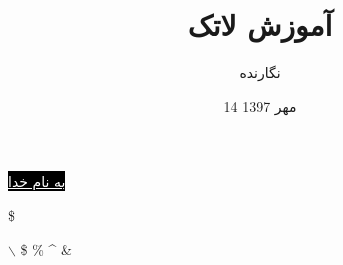 \documentclass[12pt]{article}
\title{آموزش لاتک}
\author{نگارنده}
\date{14 مهر 1397}
\begin{document}
	\maketitle
	\vspace*{2cm}
	\begin{center}
		\colorbox{black}{\textcolor{white}{\underline{\Nas به نام خدا}}}
		\begin{latin}
			\$
			\textcolor{blue}{}
			
						$\backslash$
			\$
			\%
			\textasciicircum			
			\&
			

		\end{latin}
		
	\end{center}
\end{document}
